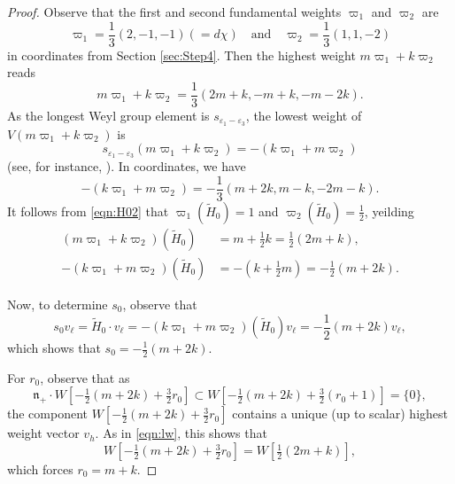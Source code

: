 \documentclass[reqno,11pt]{amsart}
\theoremstyle{remark}
\numberwithin{equation}{section}
\newcommand{\eps}{\varepsilon}
\newcommand{\fn}{{\mathfrak n}}
\newcommand{\wH}{\widetilde{H}}
\begin{document}
\begin{proof}
Observe that the first and second fundamental weights 
$\varpi_1$  and $\varpi_2$ are 
\begin{equation*}
\varpi_1 = \frac{1}{3}(2, -1, -1) (=d\chi)
\quad
\text{and}
\quad
\varpi_2 = \frac{1}{3}(1, 1, -2)
\end{equation*}
in coordinates from Section \ref{sec:Step4}.
Then the highest weight $m\varpi_1 + k\varpi_2$ reads
\begin{equation*}
m\varpi_1 + k \varpi_2 = \frac{1}{3}(2m+k,-m+k, -m-2k).
\end{equation*}
As the longest Weyl group element is 
$s_{\eps_1-\eps_3}$,  the lowest weight of $V(m\varpi_1 + k \varpi_2)$ is 
\begin{equation*}
s_{\eps_1-\eps_3}(m\varpi_1 + k \varpi_2)=-(k\varpi_1+m\varpi_2)
\end{equation*}
 (see, for instance, \cite[Thm.\ 3.2.13]{GW09}).
In coordinates, we have 
\begin{equation}\label{eqn:lowest}
 -(k\varpi_1+m\varpi_2)=
 -\frac{1}{3}(m+2k, m-k, -2m-k). 
\end{equation}
It follows from \eqref{eqn:H02} that
$\varpi_1(\wH_0) = 1$ and $\varpi_2(\wH_0) = \frac{1}{2}$,
yeilding
\begin{align*}
(m\varpi_1 + k \varpi_2)(\wH_0) &= m + \frac{1}{2}k=\frac{1}{2}(2m + k),\\[3pt]
-(k\varpi_1+m\varpi_2)(\wH_0) &= -(k + \frac{1}{2}m)
=-\frac{1}{2}(m+2k).
\end{align*}

Now, to determine $s_0$, observe that
\begin{equation}\label{eqn:lw}
s_0 v_\ell = \wH_0 \cdot v_\ell = 
-(k\varpi_1+m\varpi_2)(\wH_0) v_\ell = -\frac{1}{2}(m+2k)v_\ell,
\end{equation}
which shows that
$s_0=-\frac{1}{2}(m+2k)$.

For $r_0$, observe that as
\begin{equation*}
\fn_+\cdot W[-\tfrac{1}{2}(m+2k)+\tfrac{3}{2}r_0] \subset
 W[-\tfrac{1}{2}(m+2k)+\tfrac{3}{2}(r_0+1)] =\{0\},
\end{equation*}
the component $W[-\tfrac{1}{2}(m+2k)+\tfrac{3}{2}r_0]$ contains
a unique (up to scalar) highest weight vector $v_h$.
As in \eqref{eqn:lw}, this shows that
\begin{equation*}
W[-\tfrac{1}{2}(m+2k)+\tfrac{3}{2}r_0] = W[\tfrac{1}{2}(2m + k)],
\end{equation*}
which forces
$r_0 = m+k$.
\end{proof}
\end{document}
